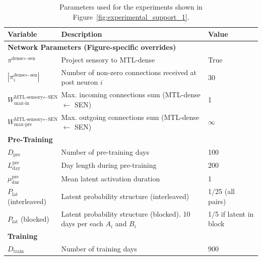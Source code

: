 \documentclass{article}
\begin{document}
\begin{table}[ht]
\centering
\caption{Parameters used for the experiments shown in Figure~\ref{fig:experimental_support_1}.}
\label{tab:fig4_parameters}
\begin{tabular}{lll}
\toprule
\textbf{Variable} & \textbf{Description} & \textbf{Value} \\
\midrule
\multicolumn{3}{l}{\textbf{Network Parameters (Figure-specific overrides)}} \\
\midrule
$\pi^{\text{dense}\leftarrow\text{sen}}$ & Project sensory to MTL-dense & True \\
$|\pi^{\text{dense}\leftarrow\text{sen}}_i|$ & Number of non-zero connections received at post neuron $i$ & 30 \\
$W^{\textrm{MTL-sensory}\leftarrow\textrm{SEN}}_\textrm{max-in}$& Max. incoming connections sum (MTL-dense $\leftarrow$ SEN)& 1 \\
$W^{\textrm{MTL-sensory}\leftarrow\textrm{SEN}}_\textrm{max-pre}$& Max. outgoing connections sum (MTL-dense $\leftarrow$ SEN) & $\infty$\\

\midrule
\multicolumn{3}{l}{\textbf{Pre-Training}} \\
\midrule
$D_{\text{pre}}$ & Number of pre-training days & 100 \\
$L_{\text{day}}^{\text{pre}}$ & Day length during pre-training & 200 \\
$\mu_{\text{dur}}^{\text{pre}}$ & Mean latent activation duration & 1 \\
$P_{\text{lat}}$ (interleaved) & Latent probability structure (interleaved) & 1/25 (all pairs) \\
$P_{\text{lat}}$ (blocked) & Latent probability structure (blocked). 10 days per each $A_i$ and $B_i$ & 1/5 if latent in block \\
\midrule
\multicolumn{3}{l}{\textbf{Training}} \\
\midrule
$D_{\text{train}}$ & Number of training days & 900 \\
\bottomrule
\end{tabular}
\end{table}
\end{document}

